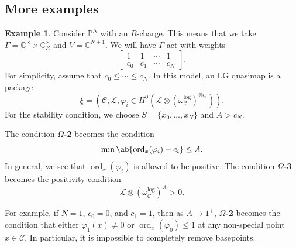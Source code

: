 \documentclass[10pt,oldfontcommands,oneside]{memoir}
\theoremstyle{definition}
\newtheorem{exm}[thm]{Example}
\theoremstyle{remark}
\theoremstyle{plain}
\theoremstyle{definition}
\theoremstyle{remark}
\newcommand{\C}{\mathbb{C}}
\renewcommand{\P}{\mathbb{P}}
\newcommand{\mc}[1]{\mathcal{#1}}
\newcommand{\on}[1]{\operatorname{#1}}
\newcommand{\1}{\mathbf{1}}
\newcommand{\2}{\mathbf{2}}
\newcommand{\3}{\mathbf{3}}
\begin{document}
\subsection{More examples}%
\label{sub:More examples}

\begin{exm}
    Consider $\P^N$ with an $R$-charge. This means that we take $\Gamma = \C^{\times} \times \C^{\times}_R$ and $V = \C^{N+1}$. We will have $\Gamma$ act with weights
    \[ \begin{bmatrix}
        1 & 1 & \cdots & 1 \\
        c_0 & c_1 & \cdots & c_N
    \end{bmatrix}. \]
    For simplicity, assume that $c_0 \leq \cdots \leq c_N$.
    In this model, an LG quasimap is a package
    \[ \xi = (\mc{C}, \mc{L}, \varphi_i \in H^0(\mc{L} \otimes ( \omega_{\mc{C}}^{\log} )^{\otimes c_i})). \]
    For the stability condition, we choose $S = \{x_0, \ldots, x_N \}$ and $A > c_N$.

    The condition \textbf{$\Omega$-2} becomes the condition
    \[ \min \ab\{ \on{ord}_x(\varphi_i) + c_i \} \leq A. \]
    In general, we see that $\on{ord}_x(\varphi_i)$ is allowed to be positive. The condition \textbf{$\Omega$-3} becomes the positivity condition
    \[ \mc{L} \otimes (\omega_{\mc{C}}^{\log})^A > 0. \]

    For example, if $N = 1$, $c_0 = 0$, and $c_1 = 1$, then as $A \to 1^+$, \textbf{$\Omega$-2} becomes the condition that either $\varphi_1(x) \neq 0$ or $\on{ord}_x ( \varphi_0 ) \leq 1$ at any non-special point $x \in \mc{C}$. In particular, it is impossible to completely remove basepoints.
\end{exm}
\end{document}

